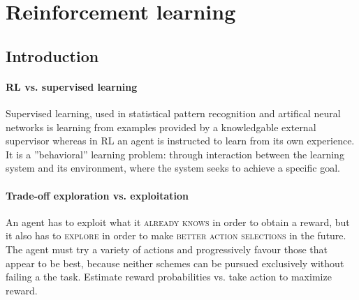 \documentclass[11pt]{article}
\begin{document}
\section{Reinforcement learning}

\subsection{Introduction}
\paragraph{RL vs. supervised learning}
Supervised learning, used in statistical pattern recognition and artifical neural networks is learning from examples provided by a knowledgable external supervisor whereas in RL an agent is instructed to learn from its own experience. It is a ''behavioral'' learning problem: through interaction between the learning system and its environment, where the system seeks to achieve a specific goal.

\paragraph{Trade-off exploration vs. exploitation}
An agent has to exploit what it \textsc{already knows} in order to obtain a reward, but it also has to \textsc{explore} in order to make \textsc{better action selections} in the future. The agent must try a variety of actions and progressively favour those that appear to be best, because neither schemes can be pursued exclusively without failing a the task. Estimate reward probabilities vs. take action to maximize reward.
\end{document}
